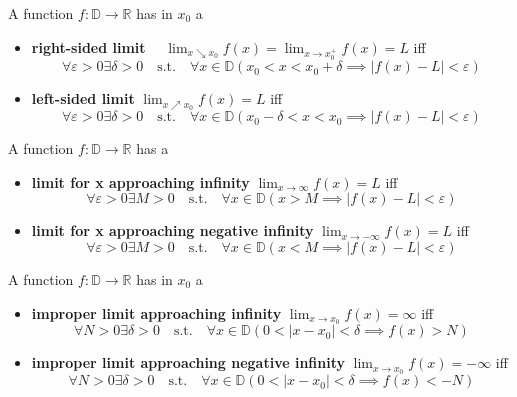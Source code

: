 \begin{definition}
    A function $f: \mathbb{D} \to \mathbb{R}$ has in $x_0$ a
    \begin{itemize}
        \item \textbf{right-sided limit} $\quad \lim_{x \searrow x_0} f(x) = \lim_{x \to x_0^+} f(x) = L$ iff 
        $$\forall \varepsilon > 0 \exists \delta > 0  \quad \text{s.t.} \quad \forall x \in \mathbb{D} (x_0 < x < x_0 + \delta \implies |f(x) - L| < \varepsilon)$$
        \item \textbf{left-sided limit} $\lim_{x \nearrow x_0} f(x) = L$ iff 
        $$\forall \varepsilon > 0 \exists \delta > 0  \quad \text{s.t.} \quad \forall x \in \mathbb{D} (x_0 - \delta < x < x_0 \implies |f(x) - L| < \varepsilon)$$
    \end{itemize}
\end{definition}

\begin{definition}
    A function $f: \mathbb{D} \to \mathbb{R}$ has a
    \begin{itemize}
        \item \textbf{limit for x approaching infinity} $\lim_{x \to \infty} f(x) = L$ iff 
        $$\forall \varepsilon > 0 \exists M > 0 \quad \text{s.t.} \quad \forall x \in \mathbb{D} (x > M \implies |f(x) - L| < \varepsilon)$$
        \item \textbf{limit for x approaching negative infinity} $\lim_{x \to -\infty} f(x) = L$ iff 
        $$\forall \varepsilon > 0 \exists M > 0 \quad \text{s.t.} \quad \forall x \in \mathbb{D} (x < M \implies |f(x) - L| < \varepsilon)$$
    \end{itemize}
\end{definition}

\begin{definition}
    A function $f: \mathbb{D} \to \mathbb{R}$ has in $x_0$ a
    \begin{itemize}
        \item \textbf{improper limit approaching infinity} $\lim_{x \to x_0} f(x) = \infty$ iff 
        $$\forall N > 0 \exists \delta > 0 \quad \text{s.t.} \quad \forall x \in \mathbb{D} (0 < |x - x_0| < \delta \implies f(x) > N)$$
        \item \textbf{improper limit approaching negative infinity} $\lim_{x \to x_0} f(x) = -\infty$ iff 
        $$\forall N > 0 \exists \delta > 0 \quad \text{s.t.} \quad \forall x \in \mathbb{D} (0 < |x - x_0| < \delta \implies f(x) < -N)$$
     \end{itemize}
\end{definition}

